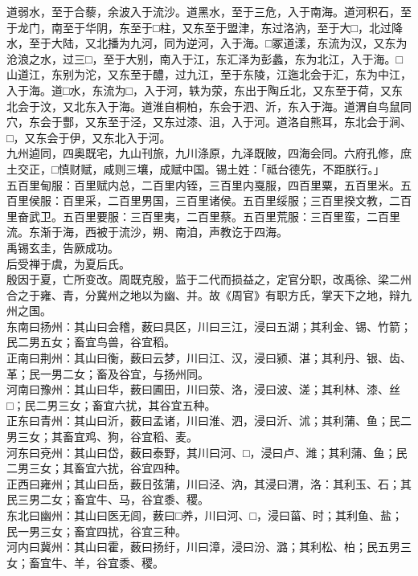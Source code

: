 \documentclass[]{article}
\begin{document}
道弱水，至于合藜，余波入于流沙。道黑水，至于三危，入于南海。道河积石，至于龙门，南至于华阴，东至于□柱，又东至于盟津，东过洛汭，至于大□，北过降水，至于大陆，又北播为九河，同为逆河，入于海。□冢道漾，东流为汉，又东为沧浪之水，过三□，至于大别，南入于江，东汇泽为彭蠡，东为北江，入于海。□山道江，东别为沱，又东至于醴，过九江，至于东陵，江迤北会于汇，东为中江，入于海。道□水，东流为□，入于河，轶为荥，东出于陶丘北，又东至于荷，又东北会于汶，又北东入于海。道淮自桐柏，东会于泗、沂，东入于海。道渭自鸟鼠同穴，东会于酆，又东至于泾，又东过漆、沮，入于河。道洛自熊耳，东北会于涧、□，又东会于伊，又东北入于河。\\
九州逌同，四奥既宅，九山刊旅，九川涤原，九泽既陂，四海会同。六府孔修，庶土交正，□慎财赋，咸则三壤，成赋中国。锡土姓：「祗台德先，不距朕行。」\\
五百里甸服：百里赋内总，二百里内铚，三百里内戛服，四百里粟，五百里米。五百里侯服：百里采，二百里男国，三百里诸侯。五百里绥服；三百里揆文教，二百里奋武卫。五百里要服：三百里夷，二百里蔡。五百里荒服：三百里蛮，二百里流。东渐于海，西被于流沙，朔、南洎，声教讫于四海。\\
禹锡玄圭，告厥成功。\\
后受禅于虞，为夏后氏。\\
殷因于夏，亡所变改。周既克殷，监于二代而损益之，定官分职，改禹徐、梁二州合之于雍、青，分冀州之地以为幽、并。故《周官》有职方氏，掌天下之地，辩九州之国。\\
东南曰扬州：其山曰会稽，薮曰具区，川曰三江，浸曰五湖；其利金、锡、竹箭；民二男五女；畜宜鸟兽，谷宜稻。\\
正南曰荆州：其山曰衡，薮曰云梦，川曰江、汉，浸曰颍、湛；其利丹、银、齿、革；民一男二女；畜及谷宜，与扬州同。\\
河南曰豫州：其山曰华，薮曰圃田，川曰荥、洛，浸曰波、溠；其利林、漆、丝□；民二男三女；畜宜六扰，其谷宜五种。\\
正东曰青州：其山曰沂，薮曰孟诸，川曰淮、泗，浸曰沂、沭；其利蒲、鱼；民二男三女；其畜宜鸡、狗，谷宜稻、麦。\\
河东曰兗州：其山曰岱，薮曰泰野，其川曰河、□，浸曰卢、潍；其利蒲、鱼；民二男三女；其畜宜六扰，谷宜四种。\\
正西曰雍州；其山曰岳，薮日弦蒲，川曰泾、汭，其浸曰渭，洛：其利玉、石；其民三男二女；畜宜牛、马，谷宜黍、稷。\\
东北曰幽州：其山曰医无闾，薮曰□养，川曰河、□，浸曰菑、时；其利鱼、盐；民一男三女；畜宜四扰，谷宜三种。\\
河内曰冀州：其山曰霍，薮曰扬纡，川曰漳，浸曰汾、潞；其利松、柏；民五男三女；畜宜牛、羊，谷宜黍、稷。\\
\end{document}

